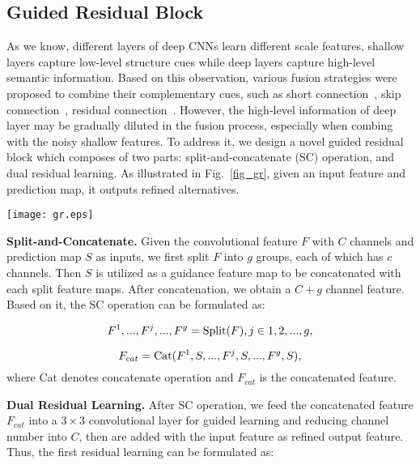 \documentclass[runningheads]{llncs}
\begin{document}
\subsection{Guided Residual Block}
As we know, different layers of deep CNNs learn different scale features, shallow layers capture low-level structure cues while deep layers capture high-level semantic information. Based on this observation, various fusion strategies were proposed to combine their complementary cues, such as short connection~\cite{hou2019deeply}, skip connection~\cite{lin2017feature}, residual connection~\cite{he2016deep}\cite{deng2018r3net}\cite{zhang2020residual}. However, the high-level information of deep layer may be gradually diluted in the fusion process, especially when combing with the noisy shallow features. To address it, we design a novel guided residual block which composes of two parts: split-and-concatenate (SC) operation, and dual residual learning. As illustrated in Fig.~\ref{fig_gr}, given an input feature and prediction map, it outputs refined alternatives.

\begin{figure*}  
  \centering  
  \texttt{[image: gr.eps]}
  \caption{The proposed guided residual blocks (dashed bounding boxes on the left), which are stacked with progressive guidance. SC denotes split-and-concatenate operation (dashed bounding box on the right).}  
  \label{fig_gr}  
\end{figure*}

\textbf{Split-and-Concatenate.} Given the convolutional feature $F$ with $C$ channels and prediction map $S$ as inputs, we first split $F$ into $g$ groups, each of which has $c$ channels. Then $S$ is utilized as a guidance feature map to be concatenated with each split feature maps. After concatenation, we obtain a $C+g$ channel feature. Based on it, the SC operation can be formulated as:

\begin{equation}
{F^{1},...,F^{j},...,F^{g}}={\rm Split}(F), j\in{1,2,...,g},
\end{equation}

\begin{equation}
F_{cat}={\rm Cat}(F^{1}, S,...,F^{j}, S,...,F^{g}, S),
\end{equation}
where Cat denotes concatenate operation and $F_{cat}$ is the concatenated feature.

\textbf{Dual Residual Learning.} After SC operation, we feed the concatenated feature $F_{cat}$ into a $3\times3$ convolutional layer for guided learning and reducing channel number into $C$, then are added with the input feature as refined output feature. Thus, the first residual learning can be formulated as:
\end{document}
